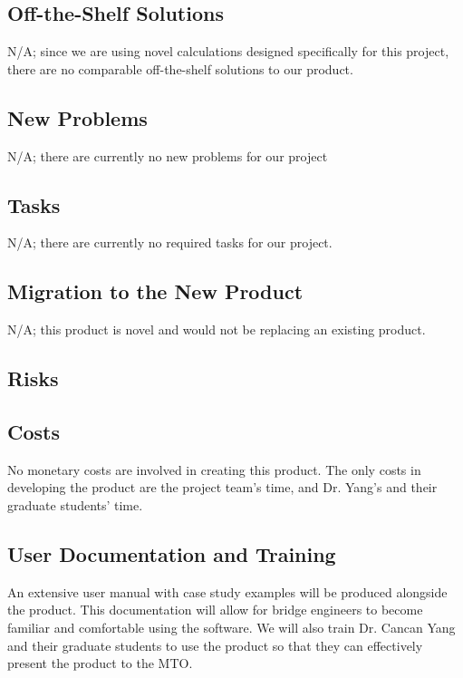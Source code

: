 \documentclass[12pt]{article}
\begin{document}
\subsection{Off-the-Shelf Solutions}

N/A; since we are using novel calculations designed specifically for this project, there are no comparable off-the-shelf solutions to our product.

\subsection{New Problems}

N/A; there are currently no new problems for our project

\subsection{Tasks}

N/A; there are currently no required tasks for our project.

\subsection{Migration to the New Product}

N/A; this product is novel and would not be replacing an existing product.

\subsection{Risks}



\subsection{Costs}

No monetary costs are involved in creating this product. The only costs in developing the product are the project team's time, and Dr. Yang's and their graduate students' time.

\subsection{User Documentation and Training}

An extensive user manual with case study examples will be produced alongside the product. This documentation will allow for bridge engineers to become familiar and comfortable using the software.
We will also train Dr. Cancan Yang and their graduate students to use the product so that they can effectively present the product to the MTO.
\end{document}
